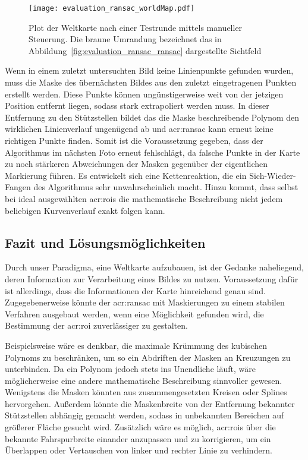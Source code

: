 \begin{figure}[htbp] %
	\centering
	\texttt{[image: evaluation\_ransac\_worldMap.pdf]}
	\caption{Plot der Weltkarte nach einer Testrunde mittels manueller Steuerung. Die braune Umrandung bezeichnet das in Abbildung~\ref{fig:evaluation_ransac_ransac} dargestellte Sichtfeld}
	\label{evaluation_ransac_weltkarte}
\end{figure} 

Wenn in einem zuletzt untersuchten Bild keine Linienpunkte gefunden wurden, muss die Maske des übernächsten Bildes aus den zuletzt eingetragenen Punkten erstellt werden. Diese Punkte können ungünstigerweise weit von der jetzigen Position entfernt liegen, sodass stark extrapoliert werden muss. In dieser Entfernung zu den Stützstellen bildet das die Maske beschreibende Polynom den wirklichen Linienverlauf ungenügend ab und \gls{acr:ransac} kann erneut keine richtigen Punkte finden. Somit ist die Voraussetzung gegeben, dass der Algorithmus im nächsten Foto erneut fehlschlägt, da falsche Punkte in der Karte zu noch stärkeren Abweichungen der Masken gegenüber der eigentlichen Markierung führen. Es entwickelt sich eine Kettenreaktion, die ein \glqq Sich-Wieder-Fangen\grqq{} des Algorithmus sehr unwahrscheinlich macht. 
Hinzu kommt, dass selbst bei ideal ausgewählten \glspl{acr:roi} die mathematische Beschreibung nicht jedem beliebigen Kurvenverlauf exakt folgen kann. 


\subsection{Fazit und Lösungsmöglichkeiten}

Durch unser Paradigma, eine Weltkarte aufzubauen, ist der Gedanke naheliegend, deren Information zur Verarbeitung eines Bildes zu nutzen. Voraussetzung dafür ist allerdings, dass die Informationen der Karte hinreichend genau sind. Zugegebenerweise könnte der \gls{acr:ransac} mit Maskierungen zu einem stabilen Verfahren ausgebaut werden, wenn eine Möglichkeit gefunden wird, die Bestimmung der \gls{acr:roi} zuverlässiger zu gestalten. 

Beispielsweise wäre es denkbar, die maximale Krümmung des kubischen Polynoms zu beschränken, um so ein Abdriften der Masken an Kreuzungen zu unterbinden. Da ein Polynom jedoch stets ins Unendliche läuft, wäre möglicherweise eine andere mathematische Beschreibung  sinnvoller gewesen. Wenigstens die Masken könnten aus zusammengesetzten Kreisen oder Splines hervorgehen. Außerdem könnte die Maskenbreite von der Entfernung bekannter Stützstellen abhängig gemacht werden, sodass in unbekannten Bereichen auf größerer Fläche gesucht wird. Zusätzlich wäre es möglich, \glspl{acr:roi} über die bekannte Fahrspurbreite einander anzupassen und zu korrigieren, um ein Überlappen oder Vertauschen von linker und rechter Linie zu verhindern.

